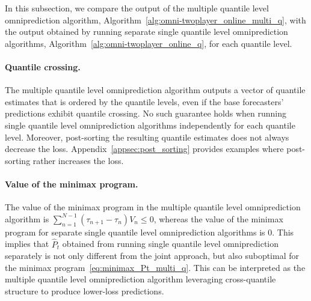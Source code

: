 In this subsection, we compare the output of the multiple quantile level omniprediction algorithm, Algorithm~\ref{alg:omni-twoplayer_online_multi_q}, with the output obtained by running separate single quantile level omniprediction algorithms, Algorithm~\ref{alg:omni-twoplayer_online_q}, for each quantile level.

\paragraph{Quantile crossing.}
The multiple quantile level omniprediction algorithm outputs a vector of quantile estimates that is ordered by the quantile levels, even if the base forecasters' predictions exhibit quantile crossing. No such guarantee holds when running single quantile level omniprediction algorithms independently for each quantile level. Moreover, post-sorting the resulting quantile estimates does not always decrease the loss. Appendix~\ref{appsec:post_sorting} provides examples where post-sorting rather increases the loss.

\paragraph{Value of the minimax program.}
The value of the minimax program in the multiple quantile level omniprediction algorithm is $\sum_{n=1}^{N-1}(\tau_{n+1}-\tau_n)V_n \leq 0$, whereas the value of the minimax program for separate single quantile level omniprediction algorithms is $0$. This implies that $\hat{P}_t$ obtained from running single quantile level omniprediction separately is not only different from the joint approach, but also suboptimal for the minimax program~\eqref{eq:minimax_Pt_multi_q}. This can be interpreted as the multiple quantile level omniprediction algorithm leveraging cross-quantile structure to produce lower-loss predictions.